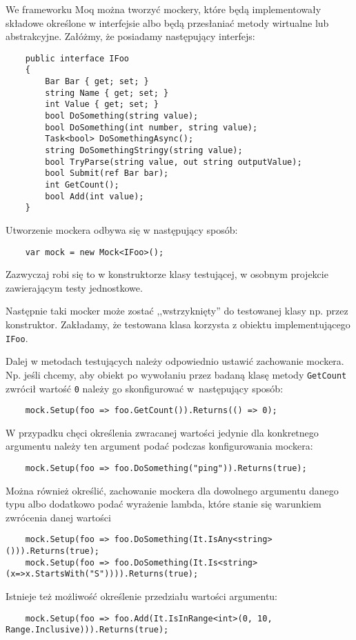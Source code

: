 We frameworku Moq można tworzyć mockery, które będą implementowały składowe określone w interfejsie albo będą przesłaniać metody wirtualne lub abstrakcyjne. Załóżmy, że posiadamy następujący interfejs:
\begin{lstlisting}
	public interface IFoo
	{
		Bar Bar { get; set; }
		string Name { get; set; }
		int Value { get; set; }
		bool DoSomething(string value);
		bool DoSomething(int number, string value);
		Task<bool> DoSomethingAsync();
		string DoSomethingStringy(string value);
		bool TryParse(string value, out string outputValue);
		bool Submit(ref Bar bar);
		int GetCount();
		bool Add(int value);
	}
\end{lstlisting}

Utworzenie mockera odbywa się w następujący sposób:
\begin{lstlisting}
	var mock = new Mock<IFoo>();
\end{lstlisting}
Zazwyczaj robi się to w konstruktorze klasy testującej, w osobnym projekcie zawierającym testy jednostkowe.

Następnie taki mocker może zostać ,,wstrzyknięty'' do testowanej klasy np. przez konstruktor. Zakładamy, że testowana klasa korzysta z obiektu implementującego \texttt{IFoo}.

Dalej w metodach testujących należy odpowiednio ustawić zachowanie mockera. Np. jeśli chcemy, aby obiekt po wywołaniu przez badaną klasę metody \texttt{GetCount} zwrócił wartość \texttt{0} należy go skonfigurować w~następujący sposób:
\begin{lstlisting}
	mock.Setup(foo => foo.GetCount()).Returns(() => 0);
\end{lstlisting}

W przypadku chęci określenia zwracanej wartości jedynie dla konkretnego argumentu należy ten argument podać podczas konfigurowania mockera:
\begin{lstlisting}
	mock.Setup(foo => foo.DoSomething("ping")).Returns(true);
\end{lstlisting}

Można również określić, zachowanie mockera dla dowolnego argumentu danego typu albo dodatkowo podać wyrażenie lambda, które stanie się warunkiem zwrócenia danej wartości
\begin{lstlisting}
	mock.Setup(foo => foo.DoSomething(It.IsAny<string>())).Returns(true);
	mock.Setup(foo => foo.DoSomething(It.Is<string>(x=>x.StartsWith("S")))).Returns(true);
\end{lstlisting}

Istnieje też możliwość określenie przedziału wartości argumentu:
\begin{lstlisting}
	mock.Setup(foo => foo.Add(It.IsInRange<int>(0, 10, Range.Inclusive))).Returns(true); 
\end{lstlisting}

